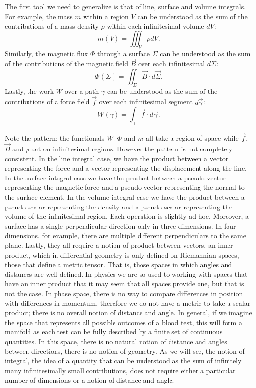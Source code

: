 The first tool we need to generalize is that of line, surface and volume integrals. For example, the mass $m$ within a region $V$ can be understood as the sum of the contributions of a mass density $\rho$ within each infinitesimal volume $dV$:
\begin{equation}
	m(V) = \iiint_V \rho dV.
\end{equation}
Similarly, the magnetic flux $\Phi$ through a surface $\Sigma$ can be understood as the sum of the contributions of the magnetic field $\vec{B}$ over each infinitesimal $d\vec{\Sigma}$:
\begin{equation}
	\Phi(\Sigma) = \iint_\Sigma \vec{B} \cdot d\vec{\Sigma}.
\end{equation}
Lastly, the work $W$ over a path $\gamma$ can be understood as the sum of the contributions of a force field $\vec{f}$ over each infinitesimal segment $d\vec{\gamma}$:
\begin{equation}
	W(\gamma) = \int_\gamma \vec{f} \cdot d\vec{\gamma}.
\end{equation}

Note the pattern: the functionals $W$, $\Phi$ and $m$ all take a region of space while $\vec{f}$, $\vec{B}$ and $\rho$ act on infinitesimal regions. However the pattern is not completely consistent. In the line integral case, we have the product between a vector representing the force and a vector representing the displacement along the line. In the surface integral case we have the product between a pseudo-vector representing the magnetic force and a pseudo-vector representing the normal to the surface element. In the volume integral case we have the product between a pseudo-scalar representing the density and a pseudo-scalar representing the volume of the infinitesimal region. Each operation is slightly ad-hoc. Moreover, a surface has a single perpendicular direction only in three dimensions. In four dimensions, for example, there are multiple different perpendiculars to the same plane. Lastly, they all require a notion of product between vectors, an inner product, which in differential geometry is only defined on Riemannian spaces, those that define a metric tensor. That is, those spaces in which angles and distances are well defined. In physics we are so used to working with spaces that have an inner product that it may seem that all spaces provide one, but that is not the case. In phase space, there is no way to compare differences in position with differences in momentum, therefore we do not have a metric to take a scalar product; there is no overall notion of distance and angle. In general, if we imagine the space that represents all possible outcomes of a blood test, this will form a manifold as each test can be fully described by a finite set of continuous quantities. In this space, there is no natural notion of distance and angles between directions, there is no notion of geometry. As we will see, the notion of integral, the idea of a quantity that can be understood as the sum of infinitely many infinitesimally small contributions, does not require either a particular number of dimensions or a notion of distance and angle.

